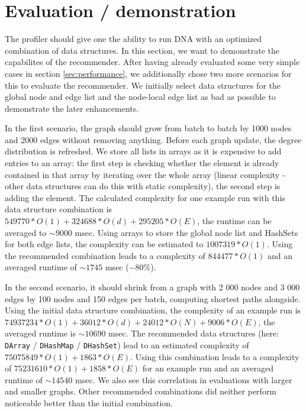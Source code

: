 \section{Evaluation / demonstration}
	The profiler should give one the ability to run DNA with an optimized combination of data
	structures. In this section, we want to demonstrate the capabilites of the recommender.
	After having already evaluated some very simple cases in section \ref{sec:performance},
	we additionally chose two more scenarios for this to evaluate the recommender. We
	initially select data structures for the global node and edge list and the node-local
	edge list as bad as possible to demonstrate the later enhancements.
	
	In the first scenario, the graph should grow from batch to batch by 1000 nodes and 2000
	edges without removing anything. Before each graph update, the degree distribution is
	refreshed. We store all lists in arrays as it is expensive to add entries to an array:
	the first step is checking whether the element is already contained in that array by
	iterating over the whole array (linear complexity - other data structures can do this
	with static complexity), the second step is adding the element. The calculated complexity
	for one example run with this data structure combination is $549770*O(1) + 324688*O(d) +
	295205*O(E)$, the runtime can be averaged to $\sim 9000$ msec. Using arrays to store the
	global node list and HashSets for both edge lists, the complexity can be estimated to
	$1007319*O(1)$. Using the recommended combination leads to a complexity of $844477*O(1)$
	and an averaged runtime of $\sim 1745$ msec ($- 80\%$).
		
	In the second scenario, it should shrink from a graph with 2 000 nodes and 3 000
	edges by 100 nodes and 150 edges per batch, computing shortest paths alongside. Using the
	initial data structure combination, the complexity of an example run is $74937234*O(1) +
	36012*O(d) + 24012*O(N) + 9006*O(E)$, the averaged runtime is $\sim 10690$ msec. The
	recommended data structures (here: \texttt{DArray} / \texttt{DHashMap} /
	\texttt{DHashSet}) lead to an estimated complexity of $75075849*O(1) + 1863*O(E)$. Using
	this combination leads to a complexity of $75231610*O(1) + 1858*O(E)$ for an example run
	and an averaged runtime of $\sim 14540$ msec. We also see this correlation in evaluations
	with larger and smaller graphs. Other recommended combinations did neither perform
	noticeable better than the initial combination.
	
	
